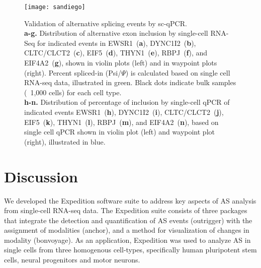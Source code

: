 \begin{figure}[h] 
  \centering
  \texttt{[image: sandiego]}
  \caption[Validation of alternative splicing events by sc-qPCR.]{
  Validation of alternative splicing events by sc-qPCR.\\
\textbf{a-g.} Distribution of alternative exon inclusion by single-cell RNA-Seq for indicated events in EWSR1~(\textbf{a}), DYNC1I2~(\textbf{b}), CLTC/CLCT2~(\textbf{c}), EIF5~(\textbf{d}), THYN1~(\textbf{e}), RBPJ~(\textbf{f}), and EIF4A2~(\textbf{g}), shown in violin plots (left) and in waypoint plots (right). Percent spliced-in (Psi/$\Psi$) is calculated based on single cell RNA-seq data, illustrated in green. Black dots indicate bulk samples (~1,000 cells) for each cell type.\\
\textbf{h-n.} Distribution of percentage of inclusion by single-cell qPCR of indicated events EWSR1~(\textbf{h}), DYNC1I2~(\textbf{i}), CLTC/CLCT2~(\textbf{j}), EIF5~(\textbf{k}), THYN1~(\textbf{l}), RBPJ~(\textbf{m}), and EIF4A2~(\textbf{n}), based on single cell qPCR shown in violin plot (left) and waypoint plot (right), illustrated in blue.
}
\label{fig:validation}
\end{figure}



\section{Discussion}
We developed the Expedition software suite to address key aspects of AS analysis from single-cell RNA-seq data. The Expedition suite consists of three packages that integrate the detection and quantification of AS events (outrigger) with the assignment of modalities (anchor), and a method for visualization of changes in modality (bonvoyage). As an application, Expedition was used to analyze AS in single cells from three homogenous cell-types, specifically human pluripotent stem cells, neural progenitors and motor neurons. 

